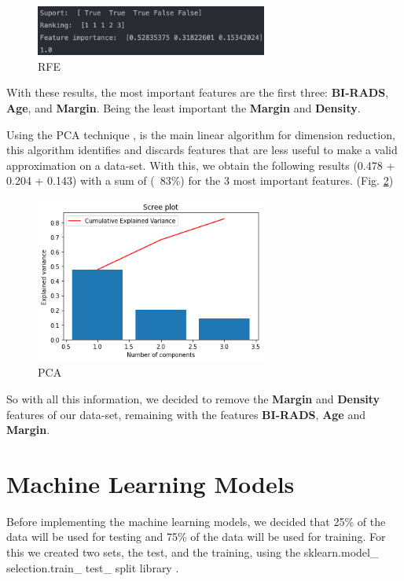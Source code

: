 \documentclass[conference]{IEEEtran}
\begin{document}
\begin{figure}[!h]
    \centering
    \includegraphics[width=3.0in]{rfe.png}
    \caption{RFE}
    \label{img:rfe.png}
\end{figure}

With these results, the most important features are the first three: \textbf{BI-RADS}, \textbf{Age}, and \textbf{Margin}. Being the least important the \textbf{Margin} and \textbf{Density}.

Using the PCA technique \cite{pca},  is the main linear algorithm for dimension reduction, this algorithm identifies and discards features that are less useful to make a valid approximation on a data-set.
With this, we obtain the following results (0.478 + 0.204 + 0.143) with a sum of (~83\%) for the 3 most important features. (Fig. \ref{img:pca.png})

\begin{figure}[!h]
    \centering
    \includegraphics[width=3.0in]{pca.png}
    \caption{PCA}
    \label{img:pca.png}
\end{figure}

So with all this information, we decided to remove the \textbf{Margin} and \textbf{Density} features of our data-set, remaining with the features \textbf{BI-RADS}, \textbf{Age} and \textbf{Margin}.

\section{Machine Learning Models}

Before implementing the machine learning models, we decided that 25\% of the data will be used for testing and 75\% of the data will be used for training. For this we created two sets, the test, and the training, using the sklearn.model\_ selection.train\_ test\_ split library \cite{train-test-split}.
\end{document}
